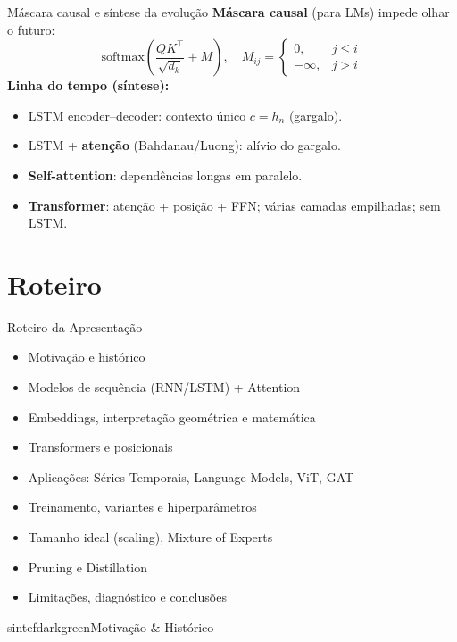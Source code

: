 \documentclass{beamer}
\begin{document}
\begin{frame}{Máscara causal e síntese da evolução}
\textbf{Máscara causal} (para LMs) impede olhar o futuro:
\[
\mathrm{softmax}\!\left(\frac{QK^\top}{\sqrt{d_k}}+M\right),
\quad
M_{ij}=\begin{cases}
0,& j\le i\\
-\infty,& j>i
\end{cases}
\]
\textbf{Linha do tempo (síntese):}
\begin{itemize}
  \item LSTM encoder--decoder: contexto único $c=h_n$ (gargalo).
  \item LSTM + \textbf{atenção} (Bahdanau/Luong): alívio do gargalo.
  \item \textbf{Self-attention}: dependências longas em paralelo.
  \item \textbf{Transformer}: atenção + posição + FFN; várias camadas empilhadas; sem LSTM.
\end{itemize}
\end{frame}

\section{Roteiro}
\begin{frame}{Roteiro da Apresentação}
\begin{itemize}[<+->]
  \item Motivação e histórico
  \item Modelos de sequência (RNN/LSTM) + Attention
  \item Embeddings, interpretação geométrica e matemática
  \item Transformers e posicionais
  \item Aplicações: Séries Temporais, Language Models, ViT, GAT
  \item Treinamento, variantes e hiperparâmetros
  \item Tamanho ideal (scaling), Mixture of Experts
  \item Pruning e Distillation
  \item Limitações, diagnóstico e conclusões
\end{itemize}
\end{frame}

\begin{chapter}{sintefdarkgreen}{Motivação \& Histórico}\end{chapter}
\end{document}
